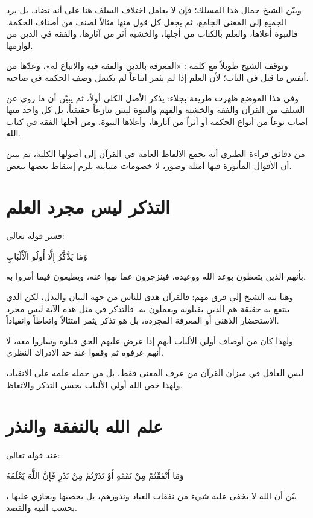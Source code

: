وبيّن الشيخ جمال هذا المسلك؛ فإن  لا يعامل اختلاف السلف هنا على أنه تضاد، بل يرد الجميع إلى المعنى الجامع، ثم يجعل كل قول منها مثالاً لصنف من أصناف الحكمة. فالنبوة أعلاها، والعلم بالكتاب من أجلها، والخشية أثر من آثارها، والفقه في الدين من لوازمها.

وتوقف الشيخ طويلاً مع كلمة : «المعرفة بالدين والفقه فيه والاتباع له»، وعدّها من أنفس ما قيل في الباب؛ لأن العلم إذا لم يثمر اتباعاً لم يكتمل وصف الحكمة في صاحبه.

وفي هذا الموضع ظهرت طريقة  بجلاء: يذكر الأصل الكلي أولاً، ثم يبيّن أن ما روي عن السلف من القرآن والفقه والخشية والفهم والنبوة ليس تنازعاً حقيقياً، بل كل واحد منها أصاب نوعاً من أنواع الحكمة أو أثراً من آثارها، وأعلاها النبوة، ومن أجلها الفقه في كتاب الله.

\begin{fawaid}
من دقائق قراءة الطبري أنه يجمع الألفاظ العامة في القرآن إلى أصولها الكلية، ثم يبين أن الأقوال المأثورة فيها أمثلة وصور، لا خصومات متباينة يلزم إسقاط بعضها ببعض.
\end{fawaid}

\section{التذكر ليس مجرد العلم}
فسر  قوله تعالى: \begin{ayah}وَمَا يَذَّكَّرُ إِلَّا أُولُو الْأَلْبَابِ\end{ayah} بأنهم الذين يتعظون بوعد الله ووعيده، فينزجرون عما نهوا عنه، ويطيعون فيما أمروا به.

وهنا نبه الشيخ إلى فرق مهم: فالقرآن هدى للناس من جهة البيان والبذل، لكن الذي ينتفع به حقيقة هم الذين يقبلونه ويعملون به. فالتذكر في مثل هذه الآية ليس مجرد الاستحضار الذهني أو المعرفة المجردة، بل هو تذكر يثمر امتثالاً واتعاظاً وانقياداً.

ولهذا كان من أوصاف أولي الألباب أنهم إذا عرض عليهم الحق قبلوه وساروا معه، لا أنهم عرفوه ثم وقفوا عند حد الإدراك النظري.

\begin{fawaid}
ليس العاقل في ميزان القرآن من عرف المعنى فقط، بل من حمله علمه على الانقياد، ولهذا خص الله أولي الألباب بحسن التذكر والاتعاظ.
\end{fawaid}

\section{علم الله بالنفقة والنذر}
عند قوله تعالى: \begin{ayah}وَمَا أَنْفَقْتُمْ مِنْ نَفَقَةٍ أَوْ نَذَرْتُمْ مِنْ نَذْرٍ فَإِنَّ اللَّهَ يَعْلَمُهُ\end{ayah}، بيّن  أن الله لا يخفى عليه شيء من نفقات العباد ونذورهم، بل يحصيها ويجازي عليها بحسب النية والقصد.


